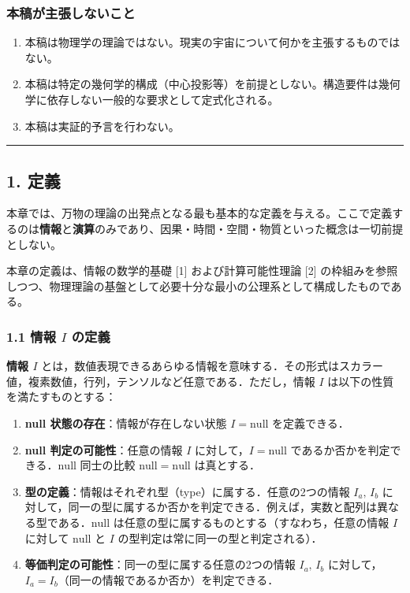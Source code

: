 \documentclass[a4paper,11pt]{ltjsarticle}
\providecommand{\tightlist}{\setlength{\itemsep}{0pt}\setlength{\parskip}{0pt}}
\begin{document}
\subsubsection{本稿が主張しないこと}\label{ux672cux7a3fux304cux4e3bux5f35ux3057ux306aux3044ux3053ux3068}

\begin{enumerate}
\def\labelenumi{\arabic{enumi}.}
\tightlist
\item
  本稿は物理学の理論ではない。現実の宇宙について何かを主張するものではない。
\item
  本稿は特定の幾何学的構成（中心投影等）を前提としない。構造要件は幾何学に依存しない一般的な要求として定式化される。
\item
  本稿は実証的予言を行わない。
\end{enumerate}

\begin{center}\rule{0.5\linewidth}{0.5pt}\end{center}

\subsection{1. 定義}\label{ux5b9aux7fa9}

本章では、万物の理論の出発点となる最も基本的な定義を与える。ここで定義するのは\textbf{情報}と\textbf{演算}のみであり、因果・時間・空間・物質といった概念は一切前提としない。

本章の定義は、情報の数学的基礎 {[}1{]} および計算可能性理論 {[}2{]}
の枠組みを参照しつつ、物理理論の基盤として必要十分な最小の公理系として構成したものである。

\subsubsection{\texorpdfstring{1.1 情報 \(I\)
の定義}{1.1 情報 I の定義}}\label{ux60c5ux5831-i-ux306eux5b9aux7fa9}

\textbf{情報 \(I\)}
とは，数値表現できるあらゆる情報を意味する．その形式はスカラー値，複素数値，行列，テンソルなど任意である．ただし，情報
\(I\) は以下の性質を満たすものとする：

\begin{enumerate}
\def\labelenumi{\arabic{enumi}.}
\tightlist
\item
  \textbf{null 状態の存在}：情報が存在しない状態 \(I = \mathrm{null}\)
  を定義できる．
\item
  \textbf{null 判定の可能性}：任意の情報 \(I\)
  に対して，\(I = \mathrm{null}\)
  であるか否かを判定できる．\(\mathrm{null}\) 同士の比較
  \(\mathrm{null} = \mathrm{null}\) は真とする．
\item
  \textbf{型の定義}：情報はそれぞれ型（type）に属する．任意の2つの情報
  \(I_a,\, I_b\)
  に対して，同一の型に属するか否かを判定できる．例えば，実数と配列は異なる型である．\(\mathrm{null}\)
  は任意の型に属するものとする（すなわち，任意の情報 \(I\) に対して
  \(\mathrm{null}\) と \(I\) の型判定は常に同一の型と判定される）．
\item
  \textbf{等価判定の可能性}：同一の型に属する任意の2つの情報
  \(I_a,\, I_b\)
  に対して，\(I_a = I_b\)（同一の情報であるか否か）を判定できる．
\end{enumerate}
\end{document}
